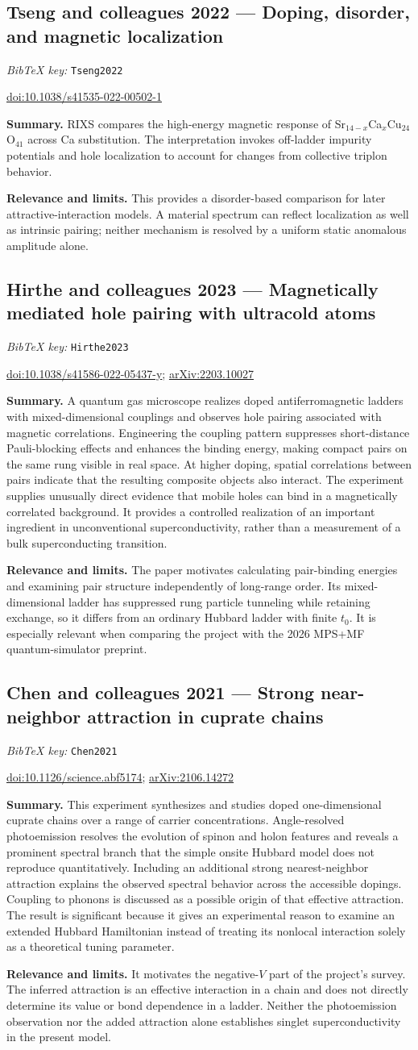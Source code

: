 \documentclass[11pt]{article}
\newcommand{\paper}[2]{\Needspace{8\baselineskip}\subsection{#2}\label{paper:#1}\textit{BibTeX key:} \texttt{#1}\quad\citep{#1}\par}
\newcommand{\doi}[1]{\href{https://doi.org/#1}{doi:#1}}
\newcommand{\arxiv}[1]{\href{https://arxiv.org/abs/#1}{arXiv:#1}}
\newcommand{\summary}{\par\textbf{Summary.} }
\newcommand{\relevance}{\par\textbf{Relevance and limits.} }
\begin{document}
\paper{Tseng2022}{Tseng and colleagues 2022 --- Doping, disorder, and magnetic localization}
\doi{10.1038/s41535-022-00502-1}
\summary RIXS compares the high-energy magnetic response of Sr$_{14-x}$Ca$_x$Cu$_{24}$O$_{41}$ across Ca substitution. The interpretation invokes off-ladder impurity potentials and hole localization to account for changes from collective triplon behavior.
\relevance This provides a disorder-based comparison for later attractive-interaction models. A material spectrum can reflect localization as well as intrinsic pairing; neither mechanism is resolved by a uniform static anomalous amplitude alone.

\paper{Hirthe2023}{Hirthe and colleagues 2023 --- Magnetically mediated hole pairing with ultracold atoms}
\doi{10.1038/s41586-022-05437-y}; \arxiv{2203.10027}
\summary A quantum gas microscope realizes doped antiferromagnetic ladders with mixed-dimensional couplings and observes hole pairing associated with magnetic correlations. Engineering the coupling pattern suppresses short-distance Pauli-blocking effects and enhances the binding energy, making compact pairs on the same rung visible in real space. At higher doping, spatial correlations between pairs indicate that the resulting composite objects also interact. The experiment supplies unusually direct evidence that mobile holes can bind in a magnetically correlated background. It provides a controlled realization of an important ingredient in unconventional superconductivity, rather than a measurement of a bulk superconducting transition.
\relevance The paper motivates calculating pair-binding energies and examining pair structure independently of long-range order. Its mixed-dimensional ladder has suppressed rung particle tunneling while retaining exchange, so it differs from an ordinary Hubbard ladder with finite $t_0$. It is especially relevant when comparing the project with the 2026 MPS+MF quantum-simulator preprint.

\paper{Chen2021}{Chen and colleagues 2021 --- Strong near-neighbor attraction in cuprate chains}
\doi{10.1126/science.abf5174}; \arxiv{2106.14272}
\summary This experiment synthesizes and studies doped one-dimensional cuprate chains over a range of carrier concentrations. Angle-resolved photoemission resolves the evolution of spinon and holon features and reveals a prominent spectral branch that the simple onsite Hubbard model does not reproduce quantitatively. Including an additional strong nearest-neighbor attraction explains the observed spectral behavior across the accessible dopings. Coupling to phonons is discussed as a possible origin of that effective attraction. The result is significant because it gives an experimental reason to examine an extended Hubbard Hamiltonian instead of treating its nonlocal interaction solely as a theoretical tuning parameter.
\relevance It motivates the negative-$V$ part of the project's survey. The inferred attraction is an effective interaction in a chain and does not directly determine its value or bond dependence in a ladder. Neither the photoemission observation nor the added attraction alone establishes singlet superconductivity in the present model.
\end{document}
